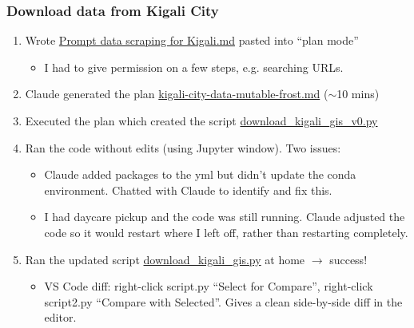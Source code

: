 \documentclass[aspectratio=169, 12pt]{beamer}
\newcommand{\ghLtwo}{https://tannerregan.github.io/GWU_AI_study_group/code/lecture_2/}
\begin{document}
\begin{frame}
\frametitle{Download data from Kigali City}

\begin{enumerate}
    \item Wrote \href{\ghLtwo/python_demo/Prompt data scraping for Kigali}{Prompt data scraping for Kigali.md} pasted into ``plan mode''
    \begin{itemize}
        \item I had to give permission on a few steps, e.g. searching URLs.
    \end{itemize}
    \item Claude generated the plan \href{\ghLtwo/python_demo/kigali-city-data-mutable-frost}{kigali-city-data-mutable-frost.md} ($\sim$10 mins)
    \item Executed the plan which created the script \href{\ghLtwo/python_demo/download_kigali_gis_v0.py}{download\_kigali\_gis\_v0.py}

    \item Ran the code without edits (using Jupyter window). Two issues: 
    \begin{itemize}
        \item Claude added packages to the yml but didn't update the conda environment. Chatted with Claude to identify and fix this. %
        \item I had daycare pickup and the code was still running. Claude adjusted the code so it would restart where I left off, rather than restarting completely.
    \end{itemize}
    \item Ran the updated script \href{\ghLtwo/python_demo/download\_kigali\_gis.py}{download\_kigali\_gis.py} at home $\rightarrow$ success!
    \begin{itemize}
        \item VS Code diff: right-click script.py ``Select for Compare'', right-click script2.py ``Compare with Selected''. Gives a clean side-by-side diff in the editor.
    \end{itemize}
\end{enumerate}
\end{frame}
\end{document}
